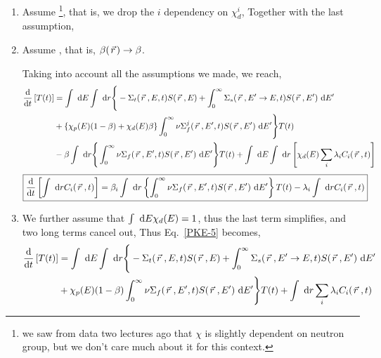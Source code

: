 \documentclass{school-22.211-notes}
\begin{document}
\begin{enumerate}
\item Assume \footnote{we saw from data two lectures ago that $\chi$ is slightly dependent on neutron group, but we don't care much about it for this context.}, that is, we drop the $i$ dependency on $\chi_d^i$, 
Together with the last assumption, 

\item Assume , that is, $\beta (\left.\vec{r}\right.) \to \beta$. 

  Taking into account all the assumptions we made, we reach, 
  \begin{align}
    \frac{\mathrm{d}}{\mathrm{d}t} \left[ T(t) \right] &= 
    \int \mbox{ }\mathrm{d} E \int \mbox{ }\mathrm{d} r \Bigg\{  - \Sigma_t (\left.\vec{r}\right., E, t) S(\left.\vec{r}\right., E)   + \int_0^{\infty} \Sigma_s (\left.\vec{r}\right., E'\to E, t) S(\left.\vec{r}\right., E') \mbox{ }\mathrm{d} E'   \notag \\
    &+ \left\{ \chi_p (E) (1-\beta) + \chi_d (E) \beta \right\} \int_0^{\infty} \nu \Sigma_f^j (\left.\vec{r}\right., E', t) S(\left.\vec{r}\right., E') \mbox{ }\mathrm{d} E'  \Bigg\} T(t)  \notag \\
    &-  \beta \int \mbox{ }\mathrm{d} r \Bigg\{ \int_0^{\infty} \nu \Sigma_f (\left.\vec{r}\right., E', t) S(\left.\vec{r}\right., E') \mbox{ }\mathrm{d} E' \Bigg\} T(t)  
    + \int \mbox{ }\mathrm{d} E \int \mbox{ }\mathrm{d} r \left[ \chi_d (E) \displaystyle\sum_i \lambda_i C_i (\left.\vec{r}\right., t) \right]   \label{PKE-5}
  \end{align}
    \begin{align}
    \Aboxed{ \ddt \left[ \int \dr C_i (\vecr, t) \right] &=  \beta_i \int \dr \left\{ \int_0^{\infty} \nu \Sigma_f (\vecr, E', t) S(\vecr, E') \dE' \right\} T(t)  - \lambda_i \int \dr C_i (\vecr, t)  } \label{PKE-6}
  \end{align}


\item We further assume that $\int \mbox{ }\mathrm{d} E \chi_d (E)  = 1$, thus the last term simplifies, and two long terms cancel out, 
Thus Eq.~\ref{PKE-5} becomes, 
  \begin{align}
    \frac{\mathrm{d}}{\mathrm{d}t} \left[ T(t) \right] &= 
    \int \mbox{ }\mathrm{d} E \int \mbox{ }\mathrm{d} r \Bigg\{  - \Sigma_t (\left.\vec{r}\right., E, t) S(\left.\vec{r}\right., E)   + \int_0^{\infty} \Sigma_s (\left.\vec{r}\right., E'\to E, t) S(\left.\vec{r}\right., E') \mbox{ }\mathrm{d} E'   \notag \\
    &+ \chi_p (E) (1-\beta) \int_0^{\infty} \nu \Sigma_f (\left.\vec{r}\right., E', t) S(\left.\vec{r}\right., E') \mbox{ }\mathrm{d} E'  \Bigg\} T(t)  +  \int \mbox{ }\mathrm{d} r  \displaystyle\sum_i \lambda_i C_i (\left.\vec{r}\right., t)    \label{PKE-7}
  \end{align}



\end{enumerate}
\end{document}
